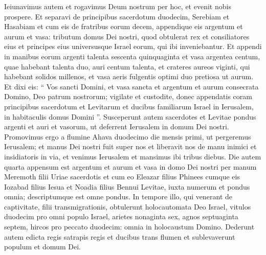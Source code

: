 \begin{biblechapter}
\begin{biblechapter}
\begin{biblechapter}
\begin{biblechapter}
\begin{biblechapter}
\begin{biblechapter}
\begin{biblechapter}
\begin{biblechapter}
\verse Ieiunavimus autem et rogavimus Deum nostrum per hoc, et evenit nobis prospere.
 \verse Et separavi de principibus sacerdotum duodecim, Serebiam et Hasabiam et cum eis de fratribus eorum decem, 
\verse appendique eis argentum et aurum et vasa: tributum domus Dei nostri, quod obtulerat rex et consiliatores eius et principes eius universusque Israel eorum, qui ibi inveniebantur. 
\verse Et appendi in manibus eorum argenti talenta sescenta quinquaginta et vasa argentea centum, quae habebant talenta duo, auri centum talenta, 
\verse et crateres aureos viginti, qui habebant solidos millenos, et vasa aeris fulgentis optimi duo pretiosa ut aurum. 
\verse Et dixi eis: “ Vos sancti Domini, et vasa sancta et argentum et aurum consecrata Domino, Deo patrum nostrorum; 
\verse vigilate et custodite, donec appendatis coram principibus sacerdotum et Levitarum et ducibus familiarum Israel in Ierusalem, in habitaculis domus Domini ”. 
\verse Susceperunt autem sacerdotes et Levitae pondus argenti et auri et vasorum, ut deferrent Ierusalem in domum Dei nostri.
 \verse Promovimus ergo a flumine Ahava duodecimo die mensis primi, ut pergeremus Ierusalem; et manus Dei nostri fuit super nos et liberavit nos de manu inimici et insidiatoris in via, 
\verse et venimus Ierusalem et mansimus ibi tribus diebus. 
\verse Die autem quarta appensum est argentum et aurum et vasa in domo Dei nostri per manum Meremoth filii Uriae sacerdotis et cum eo Eleazar filius Phinees cumque eis Iozabad filius Iesua et Noadia filius Bennui Levitae, 
\verse iuxta numerum et pondus omnia; descriptumque est omne pondus. In tempore illo, 
 \verse qui venerant de captivitate, filii transmigrationis, obtulerunt holocautomata Deo Israel, vitulos duodecim pro omni populo Israel, arietes nonaginta sex, agnos septuaginta septem, hircos pro peccato duodecim: omnia in holocaustum Domino. 
\verse Dederunt autem edicta regis satrapis regis et ducibus trans flumen et sublevaverunt populum et domum Dei.
 

\end{biblechapter}
\end{biblechapter}
\end{biblechapter}
\end{biblechapter}
\end{biblechapter}
\end{biblechapter}
\end{biblechapter}
\end{biblechapter}
